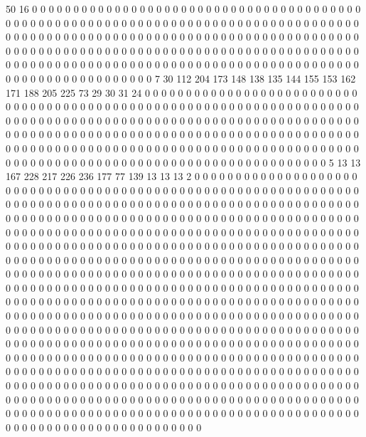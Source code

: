 50 16 0 0 0 0 0 0 0 0 0 0 0 0 0 0 0 0 0 0
0 0 0 0 0 0 0 0 0 0 0 0 0 0 0 0 0 0 0 0
0 0 0 0 0 0 0 0 0 0 0 0 0 0 0 0 0 0 0 0
0 0 0 0 0 0 0 0 0 0 0 0 0 0 0 0 0 0 0 0
0 0 0 0 0 0 0 0 0 0 0 0 0 0 0 0 0 0 0 0
0 0 0 0 0 0 0 0 0 0 0 0 0 0 0 0 0 0 0 0
0 0 0 0 0 0 0 0 0 0 0 0 0 0 0 0 0 0 0 0
0 0 0 0 0 0 0 0 0 0 0 0 0 0 0 0 0 0 0 0
0 0 0 0 0 0 0 0 0 0 0 0 0 0 0 0 0 0 0 0
0 0 0 0 0 0 0 0 0 0 0 0 0 0 0 0 0 0 0 0
0 0 0 0 0 0 0 0 0 0 0 0 0 0 0 0 0 0 0 0
0 0 0 0 0 0 0 0 0 0 0 0 7 30 112 204 173 148 138 135
144 155 153 162 171 188 205 225 73 29 30 31 24 0 0 0 0 0 0 0
0 0 0 0 0 0 0 0 0 0 0 0 0 0 0 0 0 0 0 0
0 0 0 0 0 0 0 0 0 0 0 0 0 0 0 0 0 0 0 0
0 0 0 0 0 0 0 0 0 0 0 0 0 0 0 0 0 0 0 0
0 0 0 0 0 0 0 0 0 0 0 0 0 0 0 0 0 0 0 0
0 0 0 0 0 0 0 0 0 0 0 0 0 0 0 0 0 0 0 0
0 0 0 0 0 0 0 0 0 0 0 0 0 0 0 0 0 0 0 0
0 0 0 0 0 0 0 0 0 0 0 0 0 0 0 0 0 0 0 0
0 0 0 0 0 0 0 0 0 0 0 0 0 0 0 0 0 0 0 0
0 0 0 0 0 0 0 0 0 0 0 0 0 0 0 0 0 0 0 0
0 0 0 0 0 0 0 0 0 0 0 0 0 0 0 0 0 0 0 0
0 0 0 0 0 0 0 0 0 0 0 0 0 0 0 0 0 0 0 0
0 0 0 0 0 0 0 0 0 0 5 13 13 167 228 217 226 236 177 77
139 13 13 13 2 0 0 0 0 0 0 0 0 0 0 0 0 0 0 0
0 0 0 0 0 0 0 0 0 0 0 0 0 0 0 0 0 0 0 0
0 0 0 0 0 0 0 0 0 0 0 0 0 0 0 0 0 0 0 0
0 0 0 0 0 0 0 0 0 0 0 0 0 0 0 0 0 0 0 0
0 0 0 0 0 0 0 0 0 0 0 0 0 0 0 0 0 0 0 0
0 0 0 0 0 0 0 0 0 0 0 0 0 0 0 0 0 0 0 0
0 0 0 0 0 0 0 0 0 0 0 0 0 0 0 0 0 0 0 0
0 0 0 0 0 0 0 0 0 0 0 0 0 0 0 0 0 0 0 0
0 0 0 0 0 0 0 0 0 0 0 0 0 0 0 0 0 0 0 0
0 0 0 0 0 0 0 0 0 0 0 0 0 0 0 0 0 0 0 0
0 0 0 0 0 0 0 0 0 0 0 0 0 0 0 0 0 0 0 0
0 0 0 0 0 0 0 0 0 0 0 0 0 0 0 0 0 0 0 0
0 0 0 0 0 0 0 0 0 0 0 0 0 0 0 0 0 0 0 0
0 0 0 0 0 0 0 0 0 0 0 0 0 0 0 0 0 0 0 0
0 0 0 0 0 0 0 0 0 0 0 0 0 0 0 0 0 0 0 0
0 0 0 0 0 0 0 0 0 0 0 0 0 0 0 0 0 0 0 0
0 0 0 0 0 0 0 0 0 0 0 0 0 0 0 0 0 0 0 0
0 0 0 0 0 0 0 0 0 0 0 0 0 0 0 0 0 0 0 0
0 0 0 0 0 0 0 0 0 0 0 0 0 0 0 0 0 0 0 0
0 0 0 0 0 0 0 0 0 0 0 0 0 0 0 0 0 0 0 0
0 0 0 0 0 0 0 0 0 0 0 0 0 0 0 0 0 0 0 0
0 0 0 0 0 0 0 0 0 0 0 0 0 0 0 0 0 0 0 0
0 0 0 0 0 0 0 0 0 0 0 0 0 0 0 0 0 0 0 0
0 0 0 0 0 0 0 0 0 0 0 0 0 0 0 0 0 0 0 0
0 0 0 0 0 0 0 0 0 0 0 0 0 0 0 0 0 0 0 0
0 0 0 0 0 0 0 0 0 0 0 0 0 0 0 0 0 0 0 0
0 0 0 0 0 0 0 0 0 0 0 0 0 0 0 0 0 0 0 0
0 0 0 0 0 0 0 0 0 0 0 0 0 0 0 0 0 0 0 0
0 0 0 0 0 0 0 0 0 0 0 0 0 0 0 0 0 0 0 0
0 0 0 0 0 0 0 0 0 0 0 0 0 0 0 0 0 0 0 0
0 0 0 0 0 0 0 0 0 0 0 0 0 0 0 0 0 0 0 0
0 0 0 0 0 0 0 0 0 0 0 0 0 0 0 0 0 0 0 0
0 0 0 0 0 0 0 0 0 0 0 0 0 0 0 0 0 0 0 0
0 0 0 0 0 0 0 0 0 0 0 0 0 0 0 0 0 0 0 0
0 0 0 0 0 0 0 0 0 0 0 0 0 0 0 0 0 0 0 0
0 0 0 0 0 0 0 0 0 0 0 0 0 0 0 0 0 0 0 0
0 0 0 0 0 0 0 0 0 0 0 0 0 0 0 0 0 0 0 0
0 0 0 0 0 0 0 0 0 0 0 0 0 0 0 0 0 0 0 0
0 0 0 0 0 0 0 0 0 0 0 0 0 0 0 0 0 0 0 0
